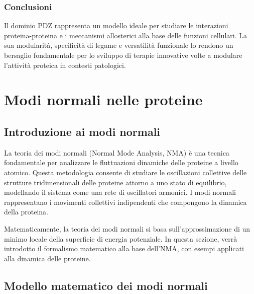\documentclass[Lau,binding=0.6cm,oneside,noexaminfo]{sapthesis}
\begin{document}
\subsection*{Conclusioni}

Il dominio PDZ rappresenta un modello ideale per studiare le interazioni proteina-proteina e i meccanismi allosterici alla base delle funzioni cellulari. La sua modularità, specificità di legame e versatilità funzionale lo rendono un bersaglio fondamentale per lo sviluppo di terapie innovative volte a modulare l’attività proteica in contesti patologici.
\chapter{Modi normali nelle proteine}

\section*{Introduzione ai modi normali}
La teoria dei modi normali (Normal Mode Analysis, NMA) è una tecnica fondamentale per analizzare le fluttuazioni dinamiche delle proteine a livello atomico. Questa metodologia consente di studiare le oscillazioni collettive delle strutture tridimensionali delle proteine attorno a uno stato di equilibrio, modellando il sistema come una rete di oscillatori armonici. I modi normali rappresentano i movimenti collettivi indipendenti che compongono la dinamica della proteina.

Matematicamente, la teoria dei modi normali si basa sull'approssimazione di un minimo locale della superficie di energia potenziale. In questa sezione, verrà introdotto il formalismo matematico alla base dell'NMA, con esempi applicati alla dinamica delle proteine.

\section{Modello matematico dei modi normali}
\end{document}
